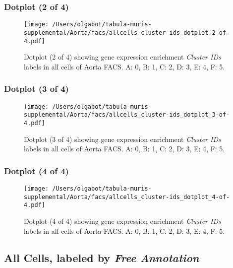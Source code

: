 \clearpage

\subsubsection{Dotplot (2 of 4)}
\begin{figure}[h]
\centering
\texttt{[image: /Users/olgabot/tabula-muris-supplemental/Aorta/facs/allcells\_cluster-ids\_dotplot\_2-of-4.pdf]}

\caption{ Dotplot (2 of 4)  showing gene expression enrichment \emph{Cluster IDs} labels in all cells of Aorta FACS. A: 0, B: 1, C: 2, D: 3, E: 4, F: 5.}
\end{figure}


\clearpage

\subsubsection{Dotplot (3 of 4)}
\begin{figure}[h]
\centering
\texttt{[image: /Users/olgabot/tabula-muris-supplemental/Aorta/facs/allcells\_cluster-ids\_dotplot\_3-of-4.pdf]}

\caption{ Dotplot (3 of 4)  showing gene expression enrichment \emph{Cluster IDs} labels in all cells of Aorta FACS. A: 0, B: 1, C: 2, D: 3, E: 4, F: 5.}
\end{figure}


\clearpage

\subsubsection{Dotplot (4 of 4)}
\begin{figure}[h]
\centering
\texttt{[image: /Users/olgabot/tabula-muris-supplemental/Aorta/facs/allcells\_cluster-ids\_dotplot\_4-of-4.pdf]}

\caption{ Dotplot (4 of 4)  showing gene expression enrichment \emph{Cluster IDs} labels in all cells of Aorta FACS. A: 0, B: 1, C: 2, D: 3, E: 4, F: 5.}
\end{figure}


\clearpage

\subsection{All Cells, labeled by \emph{Free Annotation}}

